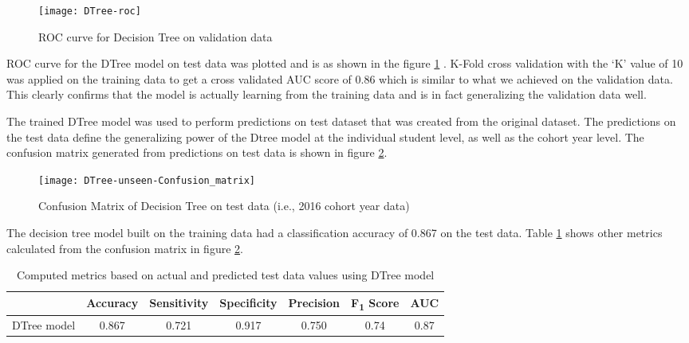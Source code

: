 \documentclass[11pt,openright]{report}
\begin{document}
 \begin{figure}[!htbp]
	\centering
	\texttt{[image: DTree-roc]}
	\caption{ROC curve for Decision Tree on validation data}
	\label{fig:DTree_roc}
\end{figure} 

ROC curve for the DTree model on test data was plotted and is as shown in the figure \ref{fig:DTree_roc} . K-Fold cross validation with the `K' value of 10 was applied on the training data to get a cross validated AUC score of 0.86 which is similar to what we achieved on the validation data. This clearly confirms that the model is actually learning from the training data and is in fact generalizing the validation data well.

The trained DTree model was used to perform predictions on test dataset that was created from the original dataset. The predictions on the test data define the generalizing power of the Dtree model at the individual student level, as well as the cohort year level. The confusion matrix generated from predictions on test data is shown in figure \ref{fig:DTree_unseen_confusion_matrix}.

  \begin{figure}[!htb]
	\centering
	\texttt{[image: DTree-unseen-Confusion\_matrix]}
	\caption{Confusion Matrix of Decision Tree on test data (i.e., 2016 cohort year data)}
	\label{fig:DTree_unseen_confusion_matrix}
\end{figure} 


The decision tree model built on the training data had a classification accuracy of 0.867 on the test data. Table \ref{table:DTree-unseen_metrics_db} shows other metrics calculated from the confusion matrix in figure \ref{fig:DTree_unseen_confusion_matrix}.

\begin{table}[!htb]
	\renewcommand{\arraystretch}{1.3}
	\caption{Computed metrics based on actual and predicted test data values using DTree model}
	\label{table:DTree-unseen_metrics_db}
	\centering
	\begin{tabular}{|c|c|c|c|c|c|c|}
    \hline
  	 & \bfseries Accuracy & \bfseries Sensitivity & \bfseries Specificity & \bfseries Precision & \bfseries F\textsubscript{1} Score  & \bfseries AUC\\  
    \hline
	DTree model & 0.867 & 0.721 & 0.917 & 0.750 & 0.74 & 0.87 \\ \hline
	\end{tabular} 
\end{table}
\end{document}
